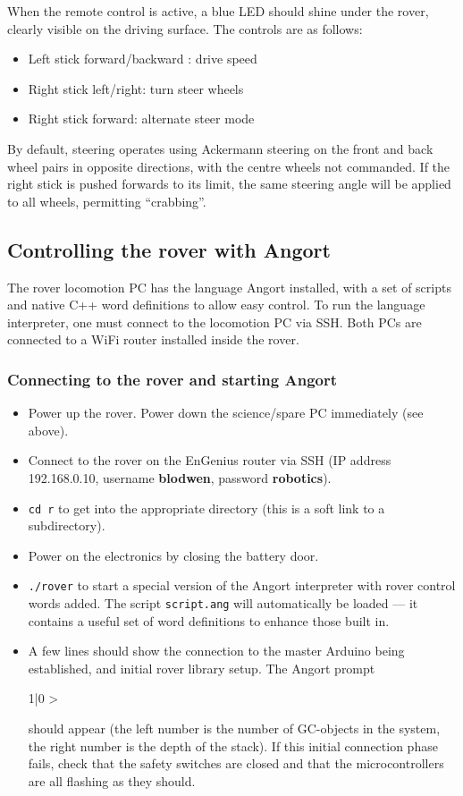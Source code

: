 When the remote control is active, a blue LED should shine under the rover,
clearly visible on the driving surface. The controls are as follows:
\begin{itemize}
\item Left stick forward/backward : drive speed
\item Right stick left/right: turn steer wheels
\item Right stick forward: alternate steer mode
\end{itemize}
By default, steering operates using Ackermann steering on the front
and back wheel pairs in opposite directions, with the centre wheels not commanded.
If the right stick is pushed forwards to its limit, the same steering angle
will be applied to all wheels, permitting ``crabbing''.

\subsection{Controlling the rover with Angort}
\label{angort}
The rover locomotion PC has the language Angort installed, with a set of scripts and native C++ word
definitions to allow easy control. To run the language interpreter, one must connect to the locomotion
PC via SSH. Both PCs are connected to a WiFi router installed inside the rover.

\subsubsection{Connecting to the rover and starting Angort}
\begin{itemize}
\item Power up the rover. Power down the science/spare PC immediately (see above).
\item Connect to the rover on the EnGenius router via SSH (IP address 192.168.0.10, username
\textbf{blodwen}, password \textbf{robotics}).
\item \texttt{cd r} to get into the appropriate directory (this is a soft link to a subdirectory).
\item Power on the electronics by closing the battery door.
\item \texttt{./rover} to start a special version of the Angort interpreter with rover control words
added. The script \texttt{script.ang} will automatically
be loaded --- it contains a useful set of word definitions to enhance those built in.
\item A few lines should show the connection to the master Arduino being established, and initial rover library setup. 
The Angort prompt
\begin{v}
1|0 >
\end{v}
should appear (the left number is the number of GC-objects in the system, the right number is
the depth of the stack). If this initial connection phase fails, check that the safety switches are
closed and that the microcontrollers are all flashing as they should.
\end{itemize}

